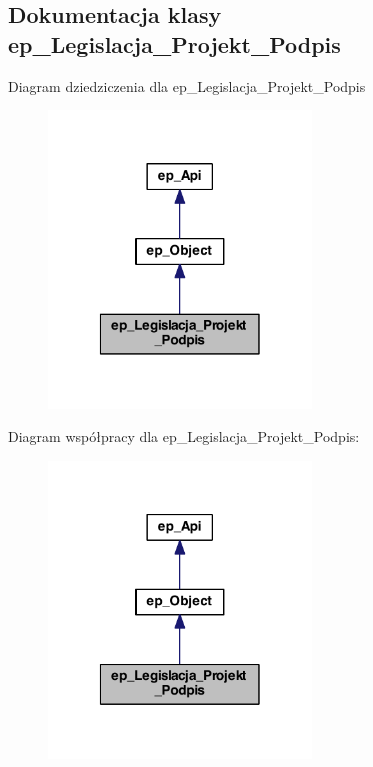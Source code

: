 \hypertarget{classep___legislacja___projekt___podpis}{\subsection{Dokumentacja klasy ep\-\_\-\-Legislacja\-\_\-\-Projekt\-\_\-\-Podpis}
\label{classep___legislacja___projekt___podpis}
}


Diagram dziedziczenia dla ep\-\_\-\-Legislacja\-\_\-\-Projekt\-\_\-\-Podpis\nopagebreak
\begin{figure}[H]
\begin{center}
\leavevmode
\includegraphics[width=198pt]{classep___legislacja___projekt___podpis__inherit__graph}
\end{center}
\end{figure}


Diagram współpracy dla ep\-\_\-\-Legislacja\-\_\-\-Projekt\-\_\-\-Podpis\-:\nopagebreak
\begin{figure}[H]
\begin{center}
\leavevmode
\includegraphics[width=198pt]{classep___legislacja___projekt___podpis__coll__graph}
\end{center}
\end{figure}
